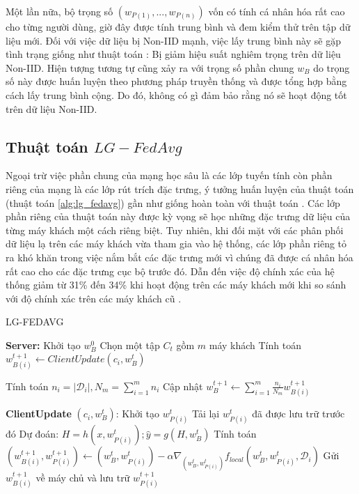 Một lần nữa, bộ trọng số $(w_{P(1)},...,w_{P(n)})$ vốn có tính cá nhân hóa rất cao cho từng người dùng, giờ đây được tính trung bình và đem kiểm thử trên tập dữ liệu mới. Đối với việc dữ liệu bị Non-IID mạnh, việc lấy trung bình này sẽ gặp tình trạng giống như thuật toán : Bị giảm hiệu suất nghiêm trọng trên dữ liệu Non-IID. Hiện tượng tương tự cũng xảy ra với trọng số phần chung $w_B$ do trọng số này được huấn luyện theo phương pháp truyền thống và được tổng hợp bằng cách lấy trung bình cộng. Do đó, không có gì đảm bảo rằng nó sẽ hoạt động tốt trên dữ liệu Non-IID.

\subsection{Thuật toán $LG-FedAvg$}

Ngoại trừ việc phần chung của mạng học sâu là các lớp tuyến tính còn phần riêng của mạng là các lớp rút trích đặc trưng, ý tưởng huấn luyện của thuật toán  (thuật toán \ref{alg:lg_fedavg}) gần như giống hoàn toàn với thuật toán . Các lớp phần riêng của thuật toán này được kỳ vọng sẽ học những đặc trưng dữ liệu của từng máy khách một cách riêng biệt. Tuy nhiên, khi đối mặt với các phân phối dữ liệu lạ trên các máy khách vừa tham gia vào hệ thống, các lớp phần riêng tỏ ra khó khăn trong việc nắm bắt các đặc trưng mới vì chúng đã được cá nhân hóa rất cao cho các đặc trưng cục bộ trước đó. Dẫn đến việc độ chính xác của hệ thống giảm từ 31\% đến 34\% khi hoạt động trên các máy khách mới khi so sánh với độ chính xác trên các máy khách cũ \cite{liang2020think}.

\begin{algorithm}
    \caption{LG-FEDAVG \cite{liang2020think}}\label{alg:lg_fedavg}
    \begin{algorithmic}[1]
        \State \textbf{Server:}
        \State Khởi tạo $w_B^0$
            \State Chọn một tập $C_t$ gồm $m$ máy khách
                \State Tính toán $w_{B(i)}^{t+1} \gets ClientUpdate(c_i,w_B^t)$
            \EndFor

            \State Tính toán $n_i = \left| \mathcal{D}_i \right|, N_m = \sum_{i=1}^m n_i$
            \State Cập nhật $w_B^{t+1} \gets \sum_{i=1}^m\frac{n_i}{N_m} w_{B(i)}^{t+1}$ %
        \EndFor

        \Statex

        \State \textbf{ClientUpdate} $(c_i, w_B^t)$: %
            \State Khởi tạo $w_{P(i)}^t$
        \Else
            \State Tải lại $w_{P(i)}^t$ đã được lưu trữ trước đó
        \EndIf
        \State Dự đoán: $H = h(x, w_{P(i)}^t); \hat{y} = g(H, w_B^t)$
        \State Tính toán $(w_{B(i)}^{t+1}, w_{P(i)}^{t+1}) \gets (w_{B}^t, w_{P(i)}^t) - \alpha\nabla_{(w_{B}^t, w_{P(i)}^t)} f_{local}(w_{B}^t, w_{P(i)}^t, \mathcal{D}_i)$
        \State Gửi $w_{B(i)}^{t+1}$ về máy chủ và lưu trữ $w_{P(i)}^{t+1}$
    \end{algorithmic}
\end{algorithm}

